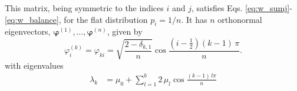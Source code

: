 \documentclass[reprint, floatfix]{revtex4-1}
\begin{document}
This matrix, being symmetric to the indices $i$ and $j$,
satisfies Eqs. \eqref{eq:w_sumj}-\eqref{eq:w_balance},
for the flat distribution $p_i = 1/n$.
%
It has $n$ orthonormal eigenvectors,
$\pmb\varphi^{(1)}, \dots, \pmb\varphi^{(n)}$,
given by
%
\begin{equation}
\varphi^{(k)}_i
=
\varphi_{k i}
=
\sqrt{
    \frac{ 2 - \delta_{k, 1} }
         {       n           }
     }
  \cos \frac{ \left( i - \frac 1 2 \right) (k - 1) \, \pi}
            {                  n                         }.
\label{eq:wband_eigenvector}
\end{equation}
%
with eigenvalues
%
\begin{align}
  \lambda_k
  &=
  \mu_0 + \sum_{l = 1}^b 2 \, \mu_l \cos \frac{(k - 1)  \, l \pi}{n}
  \label{eq:wband_eigenvalue}
\end{align}
\end{document}
